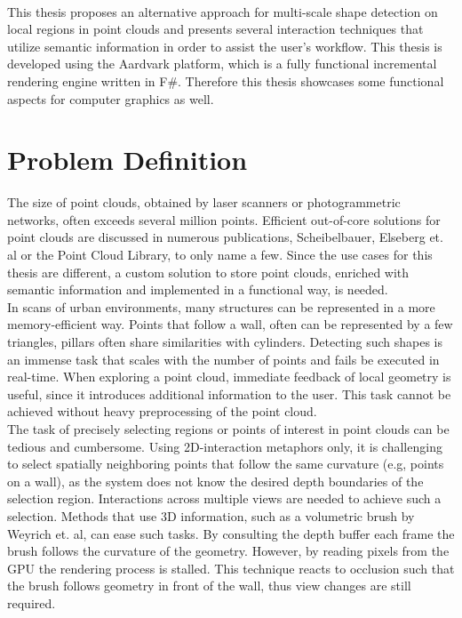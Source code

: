 \\
This thesis proposes an alternative approach for multi-scale shape detection on local regions in point clouds and presents several interaction techniques that utilize semantic information in order to assist the user's workflow. This thesis is developed using the Aardvark platform, which is a fully functional incremental rendering engine written in F\#. Therefore this thesis showcases some functional aspects for computer graphics as well. 

\section{Problem Definition}

The size of point clouds, obtained by laser scanners or photogrammetric networks, often exceeds several million points. 
Efficient out-of-core solutions for point clouds are discussed in numerous publications, Scheibelbauer\cite{scheiblauer-thesis}, Elseberg et. al\cite{elseberg2013one} or the Point Cloud Library\cite{rusu20113d}, to only name a few. Since the use cases for this thesis are different, a custom solution to store point clouds, enriched with semantic information and implemented in a functional way, is needed. 
\\
In scans of urban environments, many structures can be represented in a more memory-efficient way. Points that follow a wall, often can be represented by a few triangles, pillars often share similarities with cylinders. Detecting such shapes is an immense task that scales with the number of points and fails be executed in real-time. When exploring a point cloud, immediate feedback of local geometry is useful, since it introduces additional information to the user. This task cannot be achieved without heavy preprocessing of the point cloud. 
\\
The task of precisely selecting regions or points of interest in point clouds can be tedious and cumbersome. Using 2D-interaction metaphors only, it is challenging to
select spatially neighboring points that follow the same curvature (e.g, points on a wall), as the system does not know the desired depth boundaries of the selection region. Interactions across multiple views are needed to achieve such a selection.  Methods that use 3D information, such as a volumetric brush by Weyrich et. al\cite{weyrich2004post}, can ease such tasks. By consulting the depth buffer each frame the brush follows the curvature of the geometry. However, by reading pixels from the GPU the rendering process is stalled. This technique reacts to occlusion such that the brush follows geometry in front of the wall, thus view changes are still required.








